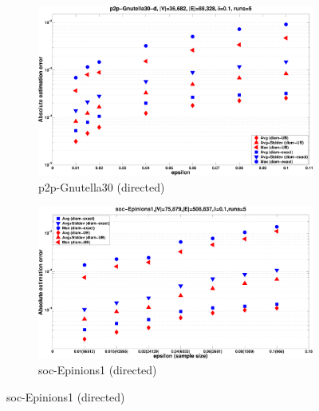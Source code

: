 \begin{figure}[htb]
  \centering
  \begin{subfigure}[b]{0.49\textwidth}
    \includegraphics[width=\textwidth]{centrsampl/figures/eps/p2p-Gnutella30-error}
    \caption{p2p-Gnutella30 (directed)}
    \label{fig:centrsamplgnutella:error}
  \end{subfigure}
  \ifproof
  \hfill
  \begin{subfigure}[b]{0.49\textwidth}
    \includegraphics[width=\textwidth]{centrsampl/figures/eps/soc-Epinions1-error}
    \caption{soc-Epinions1 (directed)}
    \label{fig:centrsamplEpinions:error}
  \end{subfigure}


\end{figure}
